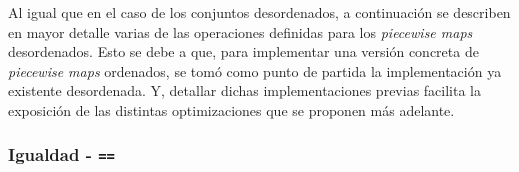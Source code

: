 Al igual que en el caso de los conjuntos desordenados, a continuación se describen en mayor detalle varias de las operaciones definidas para los \textit{piecewise maps} desordenados. Esto se debe a que, para implementar una versión concreta de \textit{piecewise maps} ordenados, se tomó como punto de partida la implementación ya existente desordenada. Y, detallar dichas implementaciones previas facilita la exposición de las distintas optimizaciones que se proponen más adelante.

\subsubsection{Igualdad - \texttt{==}} 


